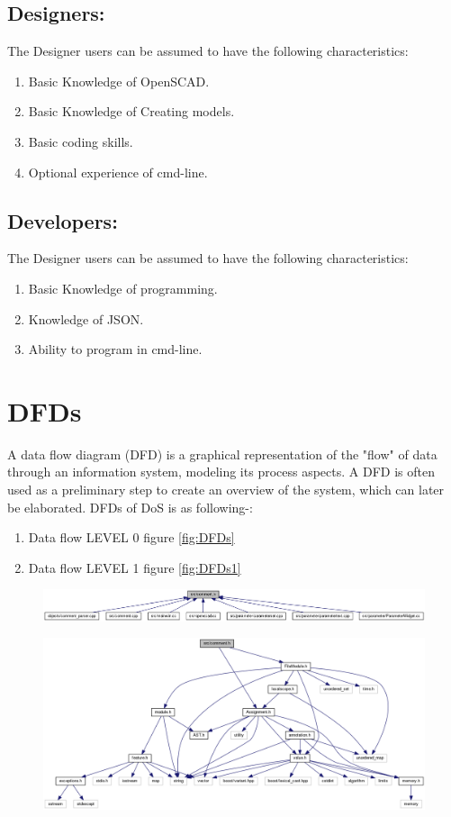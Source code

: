 \subsection{Designers:}
The Designer users can be assumed to have the following characteristics:
\begin{enumerate}
	\item Basic Knowledge of OpenSCAD.
	\item Basic Knowledge of Creating models.
	\item Basic coding skills.
	\item Optional experience of cmd-line.
\end{enumerate}

\subsection{Developers:}
The Designer users can be assumed to have the following characteristics:
\begin{enumerate}
	\item Basic Knowledge of programming.
	\item Knowledge of JSON.
	\item Ability to program in cmd-line.
\end{enumerate}




\section{DFDs}
A data flow diagram (DFD) is a graphical representation of the "flow" of data through an information system, modeling its process aspects. A DFD is often used as a preliminary step to create an overview of the system, which can later be elaborated. DFDs of DoS is as following-:
\begin{enumerate}
\item Data flow LEVEL 0 figure \ref{fig:DFDs}
\item Data flow LEVEL 1 figure \ref{fig:DFDs1}
\end{enumerate}

\begin{figure}[H]
\centering
\includegraphics[width=0.7\linewidth]{images/comment}
\caption{}
\label{fig:comment}
\end{figure}
\begin{figure}[H]
\centering
\includegraphics[width=0.7\linewidth]{images/comment1}
\caption{}
\label{fig:comment1}
\end{figure}

